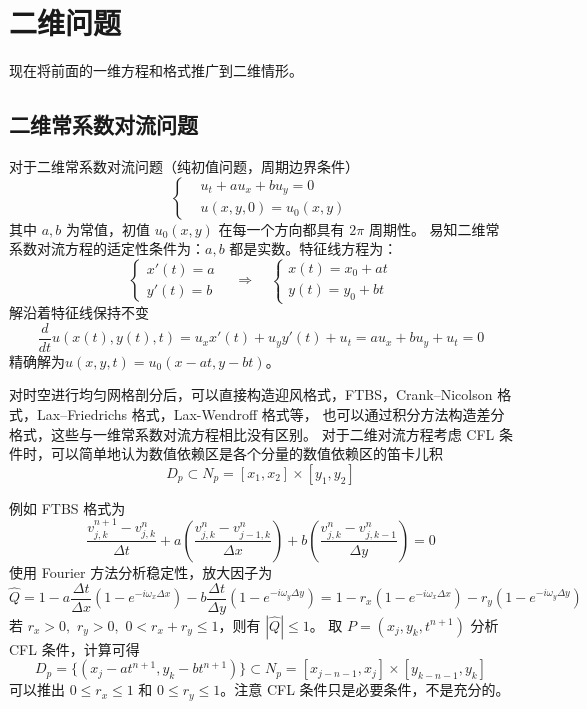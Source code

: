 \chapter{二维问题}

现在将前面的一维方程和格式推广到二维情形。


\section{二维常系数对流问题}

对于二维常系数对流问题（纯初值问题，周期边界条件）
\[
    \left\{
    \begin{aligned}
         & u_t + a u_x + b u_y = 0 \\
         & u(x,y,0) = u_0(x,y)
    \end{aligned}
    \right.
\]
其中 $a,b$ 为常值，初值 $u_0(x,y)$ 在每一个方向都具有 $2\pi$ 周期性。
易知二维常系数对流方程的适定性条件为：$a,b$ 都是实数。特征线方程为：
\[
    \left\{
    \begin{aligned}
        x'(t) = a \\
        y'(t) = b
    \end{aligned}
    \right.
    \quad \Rightarrow \quad
    \left\{
    \begin{aligned}
        x(t) = x_0 + a t \\
        y(t) = y_0 + b t
    \end{aligned}
    \right.
\]
解沿着特征线保持不变
\[
    \frac{d}{dt}u(x(t),y(t),t) = u_x x'(t) + u_y y'(t) + u_t = a u_x + b u_y + u_t = 0
\]
精确解为$u(x,y,t) = u_0(x - a t, y - b t)$。

对时空进行均匀网格剖分后，可以直接构造迎风格式，FTBS，Crank–Nicolson 格式，Lax–Friedrichs 格式，Lax-Wendroff 格式等，
也可以通过积分方法构造差分格式，这些与一维常系数对流方程相比没有区别。
对于二维对流方程考虑 CFL 条件时，可以简单地认为数值依赖区是各个分量的数值依赖区的笛卡儿积
\[
    D_p \subset  N_p = [x_1,x_2] \times [y_1,y_2]
\]

例如 FTBS 格式为
\[
    \frac{v_{j,k}^{n+1} - v_{j,k}^n}{\Delta t}
    + a \left(\frac{v_{j,k}^n - v_{j-1,k}^n}{\Delta x}\right)
    + b \left(\frac{v_{j,k}^n - v_{j,k-1}^n}{\Delta y}\right) = 0
\]
使用 Fourier 方法分析稳定性，放大因子为
\[
    \widehat{Q} = 1
    - a \frac{\Delta t}{\Delta x}(1 - e^{- i \omega_x \Delta x})
    - b \frac{\Delta t}{\Delta y}(1 - e^{- i \omega_y \Delta y})
    = 1
    - r_x(1 - e^{- i \omega_x \Delta x})
    - r_y(1 - e^{- i \omega_y \Delta y})
\]
若 $r_x > 0,\,\, r_y > 0,\,\, 0 < r_x + r_y \le 1$，则有 $|\widehat{Q}| \le 1$。
取 $P = (x_j,y_k,t^{n+1})$ 分析 CFL 条件，计算可得
\[
    D_p = \{(x_j - a t^{n+1},y_k - b t^{n+1})\} \subset N_p
    = [x_{j-n-1},x_j] \times [y_{k-n-1},y_k]
\]
可以推出 $0 \le r_x \le 1$ 和 $0 \le r_y \le 1$。注意 CFL 条件只是必要条件，不是充分的。

